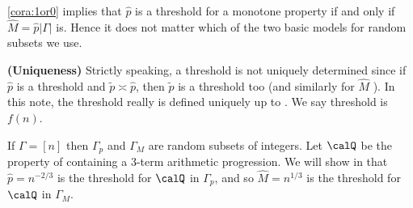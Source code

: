 \documentclass{article}
\newcommand{\bfs}[1]{\textbf{({#1}) }}
\begin{document}
\begin{rema}\label{remequthe}
\cref{cora:1or0} implies that $\widehat{p}$ is a threshold for a monotone property if and only if $\widehat{M}=\widehat{p}|\Gamma|$ is. Hence it does not matter which of the two basic models for random subsets we use.
\end{rema}

\begin{rema}{\bfs{Uniqueness}}\label{uni_hatp}
Strictly speaking, a threshold is not uniquely determined since if $\widehat{p}$ is a threshold and $\tilde{p} \asymp \widehat{p}$, then $\tilde{p}$ is a threshold too (and similarly for $\widehat{M}$ ). In this note, the threshold really is defined uniquely up to . We say  threshold is $f(n)$.
\end{rema}

\begin{exma}
 If $\Gamma=[n]$ then $\Gamma_{p}$ and $\Gamma_{M}$ are random subsets of integers. Let $\calQ$ be the property of containing a $3$-term arithmetic progression. We will show in \cite[Example $3.2$]{janson2011random} that $\widehat{p}=n^{-2 / 3}$ is the threshold for $\calQ$ in $\Gamma_{p}$, and so $\widehat{M}=n^{1 / 3}$ is the threshold for $\calQ$ in $\Gamma_{M}$.
\end{exma}
\end{document}
